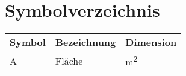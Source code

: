 \chapter{Symbolverzeichnis}\label{Kapitel:symbols} %

\begin{supertabular}[th]{p{0.2\textwidth}p{0.5\textwidth}l}
\textbf{Symbol} & \textbf{Bezeichnung}  &  \textbf{Dimension}\\
	A     		& Fläche & \si{\metre\squared}\\
\end{supertabular}
